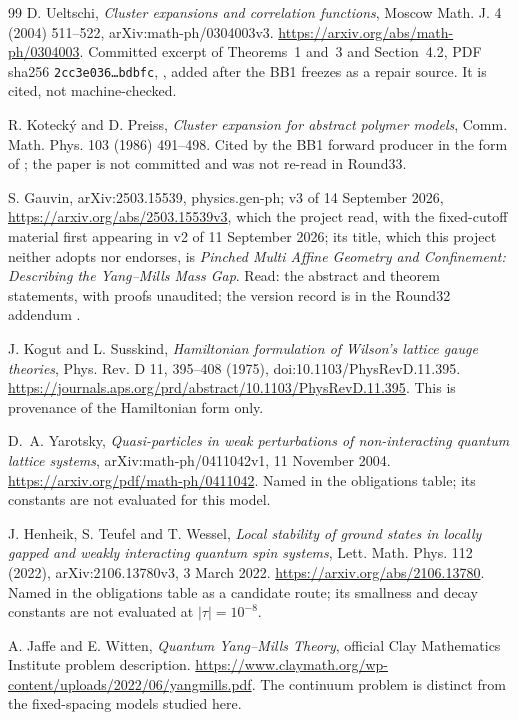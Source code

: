 \begin{thebibliography}{99}
D. Ueltschi,
\emph{Cluster expansions and correlation functions}, Moscow Math. J. 4
(2004) 511--522, arXiv:math-ph/0304003v3.
\url{https://arxiv.org/abs/math-ph/0304003}.
Committed excerpt of Theorems~1 and~3 and Section~4.2, PDF sha256
\texttt{2cc3e036\ldots bdbfc},
, added after the BB1 freezes as a repair source. It is cited, not
machine-checked.

R. Kotecký and D. Preiss,
\emph{Cluster expansion for abstract polymer models}, Comm. Math. Phys. 103
(1986) 491--498.
Cited by the BB1 forward producer in the form of \cite{ueltschi}; the paper
is not committed and was not re-read in Round33.

S. Gauvin, arXiv:2503.15539, physics.gen-ph; v3 of 14 September 2026,
\url{https://arxiv.org/abs/2503.15539v3}, which the project read, with the
fixed-cutoff material first appearing in v2 of 11 September 2026; its title,
which this project neither adopts nor endorses, is \emph{Pinched Multi Affine
Geometry and Confinement: Describing the Yang--Mills Mass Gap}. Read: the
abstract and theorem statements, with proofs unaudited; the version record is
in the Round32 addendum \cite{r32add}.

J. Kogut and L. Susskind,
\emph{Hamiltonian formulation of Wilson's lattice gauge theories},
Phys. Rev. D 11, 395--408 (1975), doi:10.1103/PhysRevD.11.395.
\url{https://journals.aps.org/prd/abstract/10.1103/PhysRevD.11.395}.
This is provenance of the Hamiltonian form only.

D.~A. Yarotsky,
\emph{Quasi-particles in weak perturbations of non-interacting quantum lattice
systems}, arXiv:math-ph/0411042v1, 11 November 2004.
\url{https://arxiv.org/pdf/math-ph/0411042}.
Named in the obligations table; its constants are not evaluated for this
model.

J. Henheik, S. Teufel and T. Wessel,
\emph{Local stability of ground states in locally gapped and weakly
interacting quantum spin systems}, Lett. Math. Phys. 112 (2022),
arXiv:2106.13780v3, 3 March 2022.
\url{https://arxiv.org/abs/2106.13780}.
Named in the obligations table as a candidate route; its smallness and decay
constants are not evaluated at $|\tau|=10^{-8}$.

A. Jaffe and E. Witten, \emph{Quantum Yang--Mills Theory},
official Clay Mathematics Institute problem description.
\url{https://www.claymath.org/wp-content/uploads/2022/06/yangmills.pdf}.
The continuum problem is distinct from the fixed-spacing models studied here.
\end{thebibliography}
